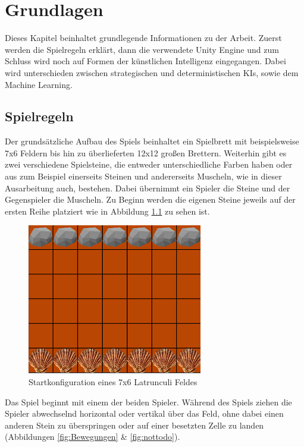 
\chapter{Grundlagen}
\label{ch:Grundlagen}
Dieses Kapitel beinhaltet grundlegende Informationen zu der Arbeit. Zuerst werden die Spielregeln erklärt, dann die verwendete Unity Engine und zum Schluss wird noch auf Formen der künstlichen Intelligenz eingegangen. Dabei wird unterschieden zwischen strategischen und deterministischen KIs, sowie dem Machine Learning.
\section{Spielregeln}
\label{ch:Grundlagen:sec:Abschnitt1}
Der grundsätzliche Aufbau des Spiels beinhaltet ein Spielbrett mit beispielsweise 7x6 Feldern bis hin zu überlieferten 12x12 großen Brettern. Weiterhin gibt es zwei verschiedene Spielsteine, die entweder unterschiedliche Farben haben oder aus zum Beispiel einerseits Steinen und andererseits Muscheln, wie in dieser Ausarbeitung auch, bestehen. Dabei übernimmt ein Spieler die Steine und der Gegenspieler die Muscheln. Zu Beginn werden die eigenen Steine jeweils auf der ersten Reihe platziert wie in Abbildung \ref{fig:startzustand} zu sehen ist.


\begin{figure}[h]
\centering
\includegraphics{img/regeln_startzustand2}
\caption{Startkonfiguration eines 7x6 Latrunculi Feldes}
\label{fig:startzustand}
\end{figure}

Das Spiel beginnt mit einem der beiden Spieler. Während des Spiels ziehen die Spieler abwechselnd horizontal oder vertikal über das Feld, ohne dabei einen anderen Stein zu überspringen oder auf einer besetzten Zelle zu landen (Abbildungen \ref{fig:Bewegungen} \& \ref{fig:nottodo}).


